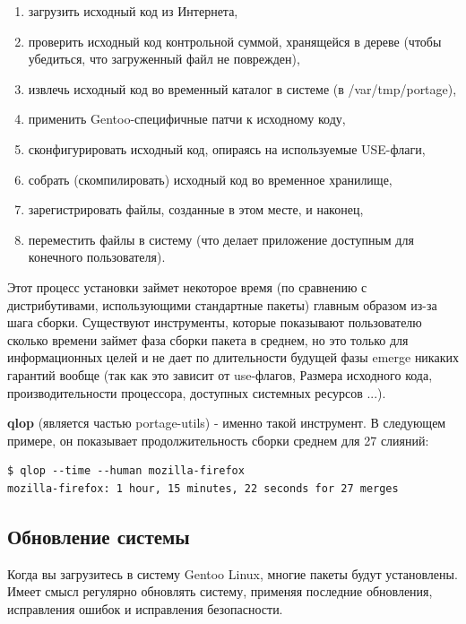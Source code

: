 \documentclass[10pt]{book}
\begin{document}
\begin{enumerate} 
\item загрузить исходный код из Интернета,
\item проверить исходный код контрольной суммой, хранящейся в дереве (чтобы убедиться, что загруженный
файл не поврежден),
\item извлечь исходный код во временный каталог в системе (в /var/tmp/portage),
\item применить Gentoo-специфичные патчи к исходному коду,
\item сконфигурировать исходный код, опираясь на используемые USE-флаги,
\item собрать (скомпилировать) исходный код во временное хранилище,
\item зарегистрировать файлы, созданные в этом месте, и наконец,
\item переместить файлы в систему (что делает приложение доступным для конечного пользователя).
\end{enumerate}

Этот процесс установки займет некоторое время (по сравнению с дистрибутивами, использующими стандартные пакеты) главным образом из-за шага сборки. Существуют инструменты, которые показывают пользователю сколько времени займет фаза сборки пакета в среднем, но это только для информационных целей и не дает  по длительности будущей фазы emerge никаких гарантий вообще (так как это зависит от use-флагов, Размера исходного кода, производительности процессора, доступных системных ресурсов ...).

\textbf{qlop}  (является частью portage-utils) - именно такой инструмент. В следующем примере, он показывает продолжительность сборки среднем для 27 слияний:

\begin{tcolorbox}
\begin{lstlisting}
$ qlop --time --human mozilla-firefox
mozilla-firefox: 1 hour, 15 minutes, 22 seconds for 27 merges
\end{lstlisting}
\end{tcolorbox}

\subsection{Обновление системы}


Когда вы загрузитесь в систему Gentoo Linux, многие пакеты будут установлены. Имеет смысл регулярно обновлять систему, применяя последние обновления, исправления ошибок и исправления безопасности.
\end{document}
